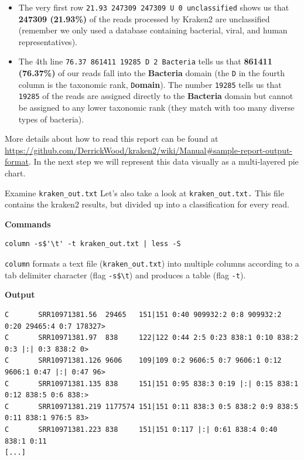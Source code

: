 \documentclass[
]{book}
\providecommand{\tightlist}{%
  \setlength{\itemsep}{0pt}\setlength{\parskip}{0pt}}
\begin{document}
\begin{itemize}
\tightlist
\item
  The very first row \texttt{21.93\ 247309\ 247309\ U\ 0\ unclassified} shows us that \textbf{247309 (21.93\%)} of the reads processed by Kraken2 are unclassified (remember we only used a database containing bacterial, viral, and human representatives).
\item
  The 4th line \texttt{76.37\ 861411\ 19285\ D\ 2\ Bacteria} tells us that \textbf{861411 (76.37\%)} of our reads fall into the \textbf{Bacteria} domain (the \texttt{D} in the fourth column is the taxonomic rank, \texttt{D}\textbf{omain}). The number \texttt{19285} tells us that \texttt{19285} of the reads are assigned directly to the \textbf{Bacteria} domain but cannot be assigned to any lower taxonomic rank (they match with too many diverse types of bacteria).
\end{itemize}

More details about how to read this report can be found at \url{https://github.com/DerrickWood/kraken2/wiki/Manual\#sample-report-output-format}. In the next step we will represent this data visually as a multi-layered pie chart.

Examine \texttt{kraken\_out.txt}
Let's also take a look at \texttt{kraken\_out.txt.} This file contains the kraken2 results, but divided up into a classification for every read.

\textbf{Commands}

\begin{verbatim}
column -s$'\t' -t kraken_out.txt | less -S
\end{verbatim}

\texttt{column} formats a text file (\texttt{kraken\_out.txt}) into multiple columns according to a tab delimiter character (flag \texttt{-s\textquotesingle{}\$\textbackslash{}t\textquotesingle{}}) and produces a table (flag \texttt{-t}).

\textbf{Output}

\begin{verbatim}
C       SRR10971381.56  29465   151|151 0:40 909932:2 0:8 909932:2 0:20 29465:4 0:7 178327>
C       SRR10971381.97  838     122|122 0:44 2:5 0:23 838:1 0:10 838:2 0:3 |:| 0:3 838:2 0>
C       SRR10971381.126 9606    109|109 0:2 9606:5 0:7 9606:1 0:12 9606:1 0:47 |:| 0:47 96>
C       SRR10971381.135 838     151|151 0:95 838:3 0:19 |:| 0:15 838:1 0:12 838:5 0:6 838:>
C       SRR10971381.219 1177574 151|151 0:11 838:3 0:5 838:2 0:9 838:5 0:11 838:1 976:5 83>
C       SRR10971381.223 838     151|151 0:117 |:| 0:61 838:4 0:40 838:1 0:11
[...]
\end{verbatim}
\end{document}

